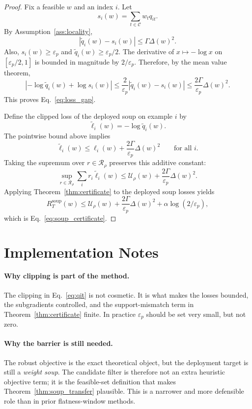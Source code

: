 \documentclass{article}
\newcommand{\cC}{\mathcal{C}}
\newcommand{\cR}{\mathcal{R}}
\begin{document}
\begin{proof}
Fix a feasible $w$ and an index $i$. Let
\[
    s_i(w)=\sum_{t\in\cC} w_t q_{it}.
\]
By Assumption~\ref{ass:locality},
\[
    |\widetilde q_i(w)-s_i(w)|
    \le
    \Gamma \Delta(w)^2.
\]
Also, $s_i(w)\ge \varepsilon_p$ and $\widetilde q_i(w)\ge \varepsilon_p/2$. The derivative of $x\mapsto -\log x$ on $[\varepsilon_p/2,1]$ is bounded in magnitude by $2/\varepsilon_p$. Therefore, by the mean value theorem,
\[
    \left|
        -\log \widetilde q_i(w) + \log s_i(w)
    \right|
    \le
    \frac{2}{\varepsilon_p} |\widetilde q_i(w)-s_i(w)|
    \le
    \frac{2\Gamma}{\varepsilon_p}\Delta(w)^2.
\]
This proves Eq.~\eqref{eq:loss_gap}.

Define the clipped loss of the deployed soup on example $i$ by
\[
    \widetilde \ell_i(w) = -\log \widetilde q_i(w).
\]
The pointwise bound above implies
\[
    \widetilde \ell_i(w)
    \le
    \ell_i(w) + \frac{2\Gamma}{\varepsilon_p}\Delta(w)^2
    \qquad \text{for all } i.
\]
Taking the supremum over $r\in\cR_{\rho}$ preserves this additive constant:
\[
    \sup_{r\in\cR_{\rho}}\sum_i r_i \widetilde \ell_i(w)
    \le
    \mathcal U_{\rho}(w) + \frac{2\Gamma}{\varepsilon_p}\Delta(w)^2.
\]
Applying Theorem~\ref{thm:certificate} to the deployed soup losses yields
\[
    R_T^{\mathrm{soup}}(w)
    \le
    \mathcal U_{\rho}(w)
    +
    \frac{2\Gamma}{\varepsilon_p}\Delta(w)^2
    +
    \alpha \log(2/\varepsilon_p),
\]
which is Eq.~\eqref{eq:soup_certificate}.
\end{proof}

\section{Implementation Notes}

\paragraph{Why clipping is part of the method.}
The clipping in Eq.~\eqref{eq:qit} is not cosmetic. It is what makes the losses bounded, the subgradients controlled, and the support-mismatch term in Theorem~\ref{thm:certificate} finite. In practice $\varepsilon_p$ should be set very small, but not zero.

\paragraph{Why the barrier is still needed.}
The robust objective is the exact theoretical object, but the deployment target is still a \emph{weight soup}. The candidate filter is therefore not an extra heuristic objective term; it is the feasible-set definition that makes Theorem~\ref{thm:soup_transfer} plausible. This is a narrower and more defensible role than in prior flatness-window methods.
\end{document}

